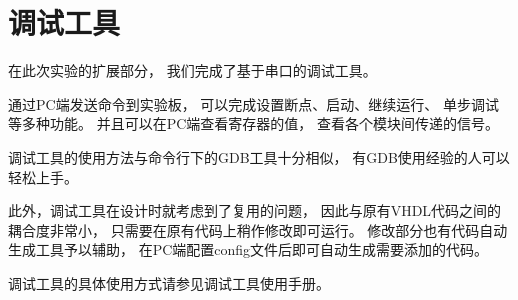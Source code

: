 \section{调试工具}
    在此次实验的扩展部分，%
    我们完成了基于串口的调试工具。

    通过PC端发送命令到实验板，%
    可以完成设置断点、启动、继续运行、%
    单步调试等多种功能。%
    并且可以在PC端查看寄存器的值，%
    查看各个模块间传递的信号。

    调试工具的使用方法与命令行下的GDB工具十分相似，%
    有GDB使用经验的人可以轻松上手。

    此外，调试工具在设计时就考虑到了复用的问题，%
    因此与原有VHDL代码之间的耦合度非常小，%
    只需要在原有代码上稍作修改即可运行。%
    修改部分也有代码自动生成工具予以辅助，%
    在PC端配置config文件后即可自动生成需要添加的代码。%

    调试工具的具体使用方式请参见调试工具使用手册。
